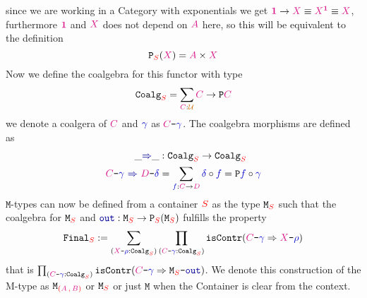 \documentclass[twoside,11pt,openright]{report}
\newcommand*{\term}[1]{\textcolor{blue!80!black}{#1}}
\newcommand*{\type}[1]{\textcolor{magenta!90!black}{#1}}
\newcommand*{\container}[1]{\textcolor{red}{#1}}
\newcommand*{\containerpair}[2]{\textcolor{red}{(}#1\,\textcolor{red}{,}\,#2\textcolor{red}{)}}
\newcommand*{\universe}[1]{\textcolor{orange!80!black}{#1}}
\newcommand*{\unit}{\type{\textbf{1}}}
\newcommand*{\coalg}[2]{#1\texttt{-}#2}
\newcommand*{\function}[1]{\textcolor{blue!60!black}{\ensuremath{\mathtt{#1}}}}
\newcommand*{\typeformer}[1]{\ensuremath{\mathtt{#1}}}
\newcommand*{\functor}[1]{\ensuremath{\mathbf{\mathtt{#1}}}}
\begin{document}
since we are working in a Category with exponentials we get \(\unit \rightarrow \type{X} \equiv \type{X}^{\unit} \equiv \type{X}\), furthermore \(\unit\) and \(\type{X}\) does not depend on \(\type{A}\) here, so this will be equivalent to the definition
\begin{equation}
  \functor{P}_{\container{S}}(\type{X}) = \type{A} \times \type{X}
\end{equation}
Now we define the coalgebra for this functor with type
\begin{equation}
  \typeformer{Coalg}_{\container{S}} = \sum_{\type{C} : \universe{\mathcal{U}}} \type{C} \rightarrow \functor{P}\type{C}
\end{equation}
we denote a coalgera of \(\type{C}\) and \(\term{\gamma}\) as \(\coalg{\type{C}}{\term{\gamma}}\). The coalgebra morphisms are defined as
\begin{equation}
  \begin{aligned}
    \_\function{\Rightarrow}\_ &: \typeformer{Coalg}_{\container{S}} \rightarrow \typeformer{Coalg}_{\container{S}} \\
    \coalg{\type{C}}{\term{\gamma}}~\function{\Rightarrow}~\coalg{\type{D}}{\term{\delta}} &= \sum_{\term{f} : \type{C} \rightarrow \type{D}} \term{\delta} \circ \term{f} = \functor{P} \term{f} \circ \term{\gamma}
  \end{aligned}
\end{equation}
\(\mathtt{M}\)-types can now be defined from a container \(\container{S}\) as the type \(\typeformer{M}_{\container{S}}\) such that the coalgebra for \(\typeformer{M}_{\container{S}}\) and \(\function{out} : \typeformer{M}_{\container{S}} \rightarrow \functor{P}_{\container{S}}(\typeformer{M}_{\container{S}})\) fulfills the property
\begin{equation}
  \typeformer{Final}_{\container{S}} := \sum_{(\coalg{\type{X}}{\term{\rho}} : \mathtt{Coalg}_{\container{S}})} \prod_{(\coalg{\type{C}}{\term{\term{\gamma}}} : \mathtt{Coalg}_{\container{S}})} \mathtt{isContr}(\coalg{\type{C}}{\term{\gamma}} \Rightarrow \coalg{\type{X}}{\term{\rho}})
\end{equation}
that is \(\prod_{(\coalg{\type{C}}{\term{\gamma}} : \mathtt{Coalg}_{\container{S}})} \mathtt{isContr}(\coalg{\type{C}}{\term{\gamma}} \Rightarrow \coalg{\typeformer{M}_{\container{S}}}{\function{out}})\). We denote this construction of the M-type as \(\typeformer{M}_{\containerpair{\type{A}}{\type{B}}}\) or \(\typeformer{M}_{\container{S}}\) or just \(\typeformer{M}\) when the Container is clear from the context.
\end{document}

